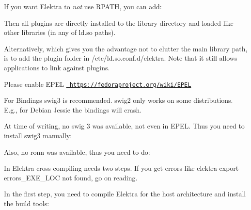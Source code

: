 If you want Elektra to {\itshape not} use {\ttfamily R\+P\+A\+TH}, you can add\+:


\begin{DoxyCode}{0}
\end{DoxyCode}


Then all plugins are directly installed to the library directory and loaded like other libraries (in any of {\ttfamily ld.\+so} paths).

Alternatively, which gives you the advantage not to clutter the main library path, is to add the plugin folder in {\ttfamily /etc/ld.so.\+conf.\+d/elektra}. Note that it still allows applications to link against plugins.

Please enable E\+P\+EL \href{https://fedoraproject.org/wiki/EPEL}{\texttt{ https\+://fedoraproject.\+org/wiki/\+E\+P\+EL}}


\begin{DoxyCode}{0}
\end{DoxyCode}


For Bindings swig3 is recommended. swig2 only works on some distributions. E.\+g., for Debian Jessie the bindings will crash.

At time of writing, no swig 3 was available, not even in E\+P\+EL. Thus you need to install swig3 manually\+:


\begin{DoxyCode}{0}
\end{DoxyCode}


Also, no ronn was available, thus you need to do\+:


\begin{DoxyCode}{0}
\end{DoxyCode}


In Elektra cross compiling needs two steps. If you get errors like {\ttfamily elektra-\/export-\/errors\+\_\+\+E\+X\+E\+\_\+\+L\+OC} not found, go on reading.

In the first step, you need to compile Elektra for the host architecture and install the build tools\+:


